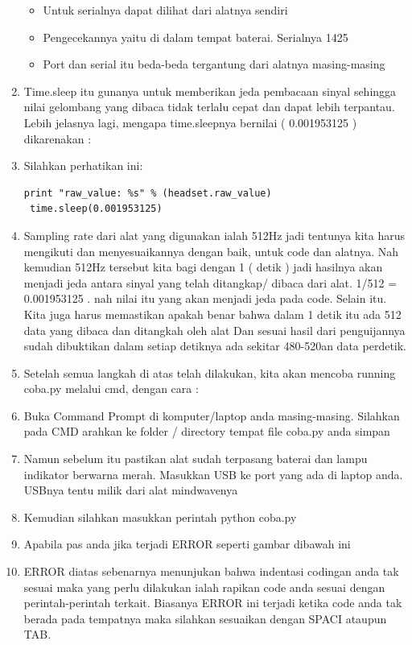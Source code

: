 \begin{enumerate}
\begin{itemize}
\item Untuk serialnya dapat dilihat dari alatnya sendiri 
\item Pengecekannya yaitu di dalam tempat baterai. Serialnya 1425
\item Port dan serial itu beda-beda tergantung dari alatnya masing-masing
\end{itemize}
\item Time.sleep itu gunanya untuk memberikan jeda pembacaan sinyal sehingga nilai gelombang yang dibaca tidak terlalu cepat dan dapat lebih terpantau. Lebih jelasnya lagi, mengapa time.sleepnya bernilai ( 0.001953125 ) dikarenakan :
\item Silahkan perhatikan ini:
\begin{verbatim}
print "raw_value: %s" % (headset.raw_value)
 time.sleep(0.001953125)
\end{verbatim} 
\item Sampling rate dari alat yang digunakan ialah 512Hz jadi tentunya kita harus mengikuti dan menyesuaikannya dengan baik, untuk code dan alatnya. Nah kemudian 512Hz tersebut kita bagi dengan 1 ( detik ) jadi hasilnya akan menjadi jeda antara sinyal yang telah ditangkap/ dibaca dari alat. 1/512 = 0.001953125 . nah nilai itu yang akan menjadi jeda pada code.
 Selain itu. Kita juga harus memastikan apakah benar bahwa dalam 1 detik itu ada 512 data yang dibaca dan ditangkah oleh alat Dan sesuai hasil dari penguijannya sudah dibuktikan dalam setiap detiknya ada sekitar 480-520an data perdetik.
\item Setelah semua langkah di atas telah dilakukan, kita akan mencoba running coba.py melalui cmd, dengan cara :
\item Buka Command Prompt di komputer/laptop anda masing-masing. Silahkan pada CMD arahkan ke folder / directory tempat file coba.py anda simpan
\item Namun sebelum itu pastikan alat sudah terpasang baterai dan lampu indikator berwarna merah. Masukkan USB ke port yang ada di laptop anda. USBnya tentu milik dari alat mindwavenya
\item Kemudian silahkan masukkan perintah python coba.py
\item Apabila pas anda jika terjadi ERROR seperti gambar dibawah ini  
\item ERROR diatas sebenarnya menunjukan bahwa indentasi codingan anda tak sesuai maka yang perlu dilakukan ialah rapikan code anda sesuai dengan perintah-perintah terkait. Biasanya ERROR ini terjadi ketika code anda tak berada pada tempatnya maka silahkan sesuaikan dengan SPACI ataupun TAB. 

\end{enumerate}
